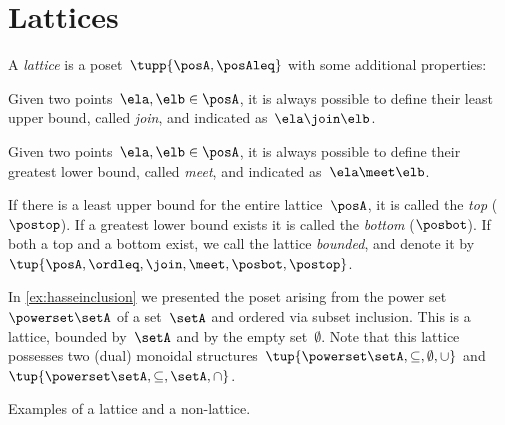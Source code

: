 

\section{Lattices}



\begin{definition}[Lattice]
  \label{def:lattice}
  A \emph{lattice} is a poset~$\tupp{\posA,\posAleq}$ with some additional properties:
  \begin{compactenum}
    \item Given two points~$\ela, \elb \in \posA$, it is always possible to define their least upper bound, called \emph{join}, and indicated as~$\ela \join \elb$.
    \item Given two points~$\ela, \elb \in \posA$, it is always possible to define their greatest lower bound, called \emph{meet}, and indicated as~$\ela \meet \elb$.
  \end{compactenum}
\end{definition}


\begin{remark}\label{rem:bounded-lattices}
  \label{def:top}
  \label{def:bot}
  If there is a least upper bound for the entire lattice~$\posA$, it is called
  the \emph{top} ($\postop$). If a greatest lower bound exists it is called the \emph{bottom} ($\posbot$). If both a top and a bottom exist, we call the lattice \emph{bounded}, and denote it by~$\tup{\posA,\ordleq,\join,\meet,\posbot,\postop}$.
\end{remark}

\begin{example}
  In \cref{ex:hasseinclusion} we presented the poset arising from the power set~$\powerset \setA$ of a set~$\setA$ and ordered via subset inclusion. This is a lattice, bounded by~$\setA$ and by the empty set~$\emptyset$. Note that this lattice possesses two (dual) monoidal structures~$\tup{\powerset \setA,\subseteq,\emptyset,\cup}$ and~$\tup{\powerset \setA,\subseteq,\setA,\cap}$.
\end{example}
\begin{marginfigure}


\caption{Examples of a lattice and a non-lattice. }
\label{fig:exlattice}
\end{marginfigure}

